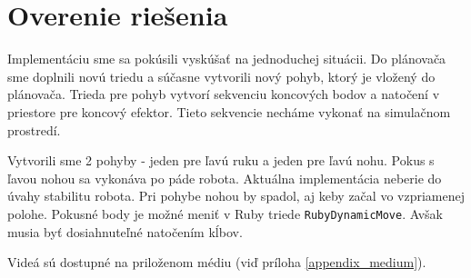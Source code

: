 \section{Overenie riešenia} \label{sec_verification}

Implementáciu sme sa pokúsili vyskúšať na jednoduchej situácii. Do plánovača sme doplnili novú triedu a súčasne vytvorili nový pohyb, ktorý je vložený do plánovača. Trieda pre pohyb vytvorí sekvenciu koncových bodov a natočení v priestore pre koncový efektor. Tieto sekvencie necháme vykonať na simulačnom prostredí.

Vytvorili sme 2 pohyby - jeden pre ľavú ruku a jeden pre ľavú nohu. Pokus s ľavou nohou sa vykonáva po páde robota. Aktuálna implementácia neberie do úvahy stabilitu robota. Pri pohybe nohou by spadol, aj keby začal vo vzpriamenej polohe. Pokusné body je možné meniť v Ruby triede \texttt{RubyDynamicMove}. Avšak musia byť dosiahnuteľné natočením kĺbov. 

Videá sú dostupné na priloženom médiu (viď príloha \ref{appendix_medium}).
